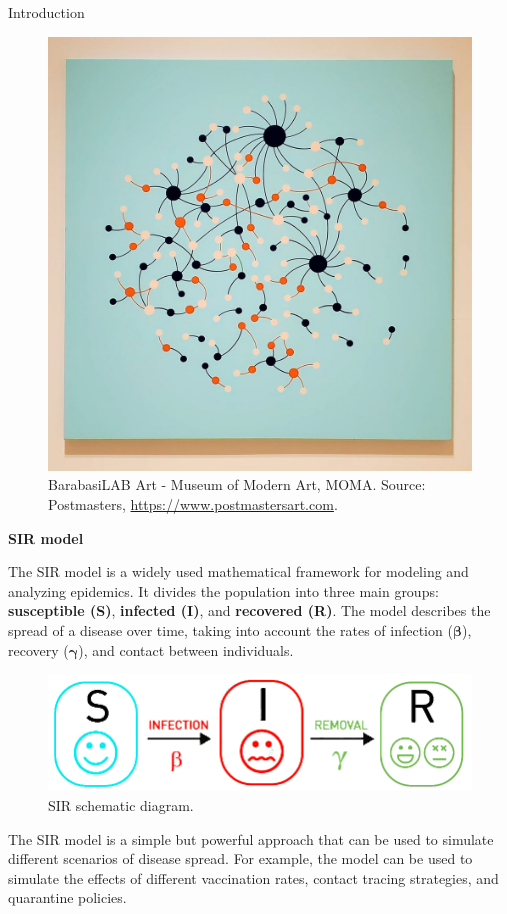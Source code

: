 \documentclass{beamer} %
\begin{document}
\begin{frame}[t]
\begin{columns}[t]
\begin{column}{0.465\textwidth}
\begin{block}{Introduction}
    \bigskip %

    \begin{figure}[h!]
		\centering %
		\includegraphics[width=0.40\linewidth]{network.jpg}
		\caption{BarabasiLAB Art - Museum of Modern Art, MOMA. Source: Postmasters, \url{https://www.postmastersart.com}.}
	\end{figure}
	
	\bigskip %

    \textbf{SIR model}

    The SIR model is a widely used mathematical framework for modeling and analyzing epidemics. It divides the population into three main groups: \textcolor{hexagram}{\textbf{susceptible (S)}}, \textcolor{hexagram1}{\textbf{infected (I)}}, and  \textcolor{hexagram2}{\textbf{recovered (R)}}. The model describes the spread of a disease over time, taking into account the rates of infection ($\boldsymbol{\beta}$), recovery ($\boldsymbol{\gamma}$), and contact between individuals.

    \bigskip

    \begin{figure}[h!]
		\centering %
		\includegraphics[width=0.54\linewidth]{SIRmodel.png}
		\caption{SIR schematic diagram.} 
	\end{figure}

    \bigskip
    
    The SIR model is a simple but powerful approach that can be used to simulate different scenarios of disease spread. For example, the model can be used to simulate the effects of different vaccination rates, contact tracing strategies, and quarantine policies.

    \bigskip
    

\end{block}
\end{column}
\end{columns}
\end{frame}
\end{document}
